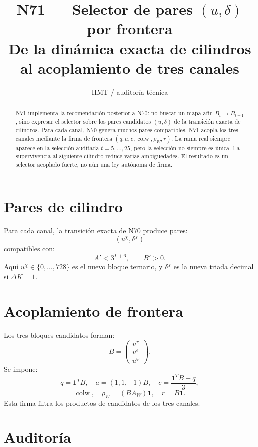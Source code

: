 \documentclass[11pt,a4paper]{article}
\title{\bfseries N71 --- Selector de pares \((u,\delta)\) por frontera\\
\large De la dinámica exacta de cilindros al acoplamiento de tres canales}
\author{HMT / auditoría técnica}
\date{}
\begin{document}
\maketitle

\begin{abstract}
N71 implementa la recomendación posterior a N70: no buscar un mapa afín \(B_t\to B_{t+1}\), sino expresar el selector sobre los pares candidatos \((u,\delta)\) de la transición exacta de cilindros. Para cada canal, N70 genera muchos pares compatibles. N71 acopla los tres canales mediante la firma de frontera \((q,a,c,\operatorname{colw},\rho_W,r)\). La rama real siempre aparece en la selección auditada \(t=5,\ldots,25\), pero la selección no siempre es única. La supervivencia al siguiente cilindro reduce varias ambigüedades. El resultado es un selector acoplado fuerte, no aún una ley autónoma de firma.
\end{abstract}

\section{Pares de cilindro}

Para cada canal, la transición exacta de N70 produce pares:
\[
(u^\chi,\delta^\chi)
\]
compatibles con:
\[
A'<3^{L+6},\qquad B'>0.
\]
Aquí \(u^\chi\in\{0,\ldots,728\}\) es el nuevo bloque ternario, y \(\delta^\chi\) es la nueva triada decimal si \(\Delta K=1\).

\section{Acoplamiento de frontera}

Los tres bloques candidatos forman:
\[
B=
\begin{pmatrix}
u^\pi\\u^e\\u^\varphi
\end{pmatrix}.
\]
Se impone:
\[
q=\mathbf1^TB,
\quad
a=(1,1,-1)B,
\quad
c=\frac{\mathbf1^TB-q}{3},
\]
\[
\operatorname{colw},
\quad
\rho_W=(BA_W)\mathbf1,
\quad
r=B\mathbf1.
\]
Esta firma filtra los productos de candidatos de los tres canales.

\section{Auditoría}
\end{document}
